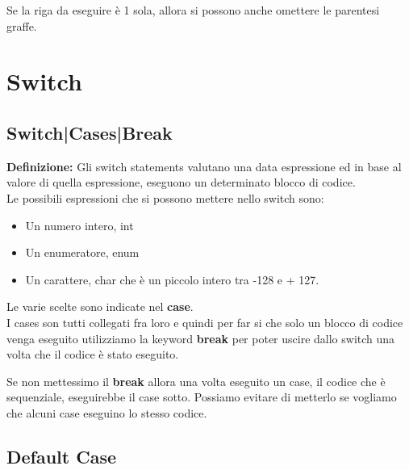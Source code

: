 \textsf{\small Se la riga da eseguire è 1 sola, allora si possono anche omettere le parentesi graffe.} \\


\section{Switch}

\subsection{Switch|Cases|Break}

\textsf{\small \textbf{Definizione: } Gli switch statements valutano una data espressione ed in base al valore di quella espressione, eseguono un determinato blocco di codice.} \\

\textsf{\small Le possibili espressioni che si possono mettere nello switch sono: }

\begin{itemize}
	\item \textsf{\small Un numero intero, \color{myblue2}int}
	\item \textsf{\small Un enumeratore, \color{myblue2}enum}
	\item \textsf{\small Un carattere, \color{myblue2}char \normalcolor che è un piccolo intero tra -128 e + 127.}
\end{itemize}

\textsf{\small Le varie scelte sono indicate nel \textbf{case}.} \\

\textsf{\small I cases son tutti collegati fra loro e quindi per far si che solo un blocco di codice venga eseguito utilizziamo la keyword \textbf{break} per poter uscire dallo switch una volta che il codice è stato eseguito.} 

\textsf{\small Se non mettessimo il \textbf{break} allora una volta eseguito un case, il codice che è sequenziale, eseguirebbe il case sotto. Possiamo evitare di metterlo se vogliamo che alcuni case eseguino lo stesso codice.} \\

\subsection{Default Case}

